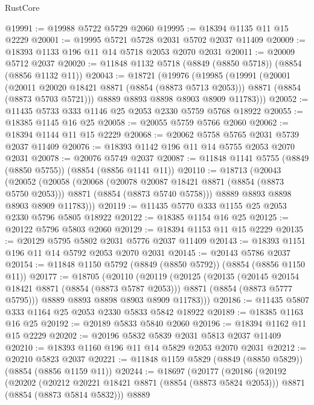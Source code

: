 \begin{lexlean}{RustCore}
\begin{coremodule}
@19991 := @19988 @5722 @5729 @2060
@19995 := @18394 @1135 @11 @15 @2229
@20001 := @19995 @5721 @5728 @2031 @5702 @2037 @11409
@20009 := @18393 @1133 @196 @11 @14 @5718 @2053 @2070 @2031
@20011 := @20009 @5712 @2037
@20020 := @11848 @1132 @5718 (@8849 (@8850 @5718)) (@8854 (@8856 @1132 @11))
@20043 := @18721
    (@19976
      (@19985
        (@19991
          (@20001
            (@20011 @20020 @18421 @8871 (@8854 (@8873 @5713 @2053)))
            @8871
            (@8854 (@8873 @5703 @5721)))
          @8889
          @8893
          @8898
          @8903
          @8909
          @11783)))
@20052 := @11435 @5733 @333 @1146 @25 @2053 @2330 @5759 @5768 @18922
@20055 := @18385 @1145 @16 @25
@20058 := @20055 @5759 @5766 @2060
@20062 := @18394 @1144 @11 @15 @2229
@20068 := @20062 @5758 @5765 @2031 @5739 @2037 @11409
@20076 := @18393 @1142 @196 @11 @14 @5755 @2053 @2070 @2031
@20078 := @20076 @5749 @2037
@20087 := @11848 @1141 @5755 (@8849 (@8850 @5755)) (@8854 (@8856 @1141 @11))
@20110 := @18713
    (@20043
      (@20052
        (@20058
          (@20068
            (@20078 @20087 @18421 @8871 (@8854 (@8873 @5750 @2053)))
            @8871
            (@8854 (@8873 @5740 @5758)))
          @8889
          @8893
          @8898
          @8903
          @8909
          @11783)))
@20119 := @11435 @5770 @333 @1155 @25 @2053 @2330 @5796 @5805 @18922
@20122 := @18385 @1154 @16 @25
@20125 := @20122 @5796 @5803 @2060
@20129 := @18394 @1153 @11 @15 @2229
@20135 := @20129 @5795 @5802 @2031 @5776 @2037 @11409
@20143 := @18393 @1151 @196 @11 @14 @5792 @2053 @2070 @2031
@20145 := @20143 @5786 @2037
@20154 := @11848 @1150 @5792 (@8849 (@8850 @5792)) (@8854 (@8856 @1150 @11))
@20177 := @18705
    (@20110
      (@20119
        (@20125
          (@20135
            (@20145 @20154 @18421 @8871 (@8854 (@8873 @5787 @2053)))
            @8871
            (@8854 (@8873 @5777 @5795)))
          @8889
          @8893
          @8898
          @8903
          @8909
          @11783)))
@20186 := @11435 @5807 @333 @1164 @25 @2053 @2330 @5833 @5842 @18922
@20189 := @18385 @1163 @16 @25
@20192 := @20189 @5833 @5840 @2060
@20196 := @18394 @1162 @11 @15 @2229
@20202 := @20196 @5832 @5839 @2031 @5813 @2037 @11409
@20210 := @18393 @1160 @196 @11 @14 @5829 @2053 @2070 @2031
@20212 := @20210 @5823 @2037
@20221 := @11848 @1159 @5829 (@8849 (@8850 @5829)) (@8854 (@8856 @1159 @11))
@20244 := @18697
    (@20177
      (@20186
        (@20192
          (@20202
            (@20212 @20221 @18421 @8871 (@8854 (@8873 @5824 @2053)))
            @8871
            (@8854 (@8873 @5814 @5832)))
          @8889

\end{coremodule}
\end{lexlean}

